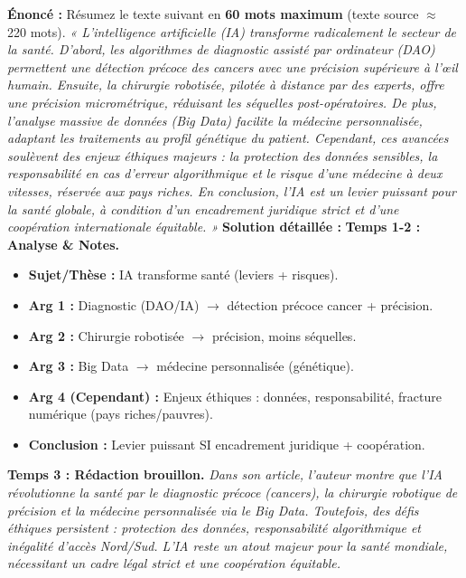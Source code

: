 \documentclass[11pt]{article}
\begin{document}
\begin{exoresolu}
    \textbf{Énoncé :} Résumez le texte suivant en \textbf{60 mots maximum} (texte source $\approx$ 220 mots).
    \medskip
    \emph{« L'intelligence artificielle (IA) transforme radicalement le secteur de la santé. D'abord, les algorithmes de diagnostic assisté par ordinateur (DAO) permettent une détection précoce des cancers avec une précision supérieure à l'œil humain. Ensuite, la chirurgie robotisée, pilotée à distance par des experts, offre une précision micrométrique, réduisant les séquelles post-opératoires. De plus, l'analyse massive de données (Big Data) facilite la médecine personnalisée, adaptant les traitements au profil génétique du patient. Cependant, ces avancées soulèvent des enjeux éthiques majeurs : la protection des données sensibles, la responsabilité en cas d'erreur algorithmique et le risque d'une médecine à deux vitesses, réservée aux pays riches. En conclusion, l'IA est un levier puissant pour la santé globale, à condition d'un encadrement juridique strict et d'une coopération internationale équitable. »}
    \tcblower
    \textbf{Solution détaillée :}
    \textbf{Temps 1-2 : Analyse \& Notes.}
    \begin{itemize}
        \item \textbf{Sujet/Thèse :} IA transforme santé (leviers + risques).
        \item \textbf{Arg 1 :} Diagnostic (DAO/IA) $\rightarrow$ détection précoce cancer + précision.
        \item \textbf{Arg 2 :} Chirurgie robotisée $\rightarrow$ précision, moins séquelles.
        \item \textbf{Arg 3 :} Big Data $\rightarrow$ médecine personnalisée (génétique).
        \item \textbf{Arg 4 (Cependant) :} Enjeux éthiques : données, responsabilité, fracture numérique (pays riches/pauvres).
        \item \textbf{Conclusion :} Levier puissant SI encadrement juridique + coopération.
    \end{itemize}
    \textbf{Temps 3 : Rédaction brouillon.}
    \emph{Dans son article, l'auteur montre que l'IA révolutionne la santé par le diagnostic précoce (cancers), la chirurgie robotique de précision et la médecine personnalisée via le Big Data. Toutefois, des défis éthiques persistent : protection des données, responsabilité algorithmique et inégalité d'accès Nord/Sud. L'IA reste un atout majeur pour la santé mondiale, nécessitant un cadre légal strict et une coopération équitable.}

\end{exoresolu}
\end{document}
